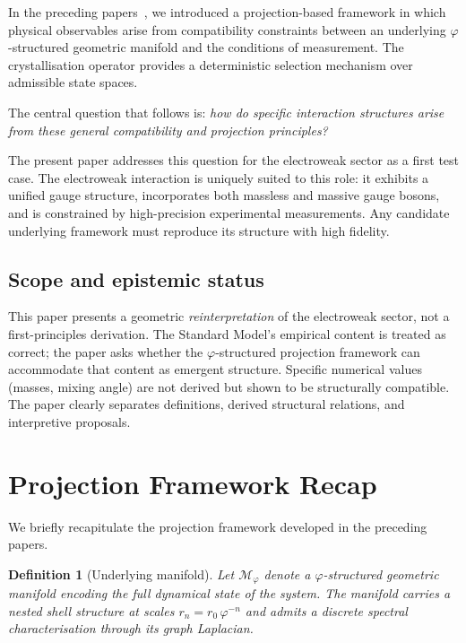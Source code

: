 \documentclass[12pt]{article}
\newtheorem{definition}[theorem]{Definition}
\newcommand{\Mcal}{\mathcal{M}}
\newcommand{\phig}{\varphi}
\begin{document}
In the preceding papers~\citep{SmartBridge, SmartV}, we introduced a projection-based framework in which physical observables arise from compatibility constraints between an underlying $\phig$-structured geometric manifold and the conditions of measurement. The crystallisation operator provides a deterministic selection mechanism over admissible state spaces.

The central question that follows is: \textit{how do specific interaction structures arise from these general compatibility and projection principles?}

The present paper addresses this question for the electroweak sector as a first test case. The electroweak interaction is uniquely suited to this role: it exhibits a unified gauge structure, incorporates both massless and massive gauge bosons, and is constrained by high-precision experimental measurements. Any candidate underlying framework must reproduce its structure with high fidelity.

\subsection*{Scope and epistemic status}

This paper presents a geometric \textit{reinterpretation} of the electroweak sector, not a first-principles derivation. The Standard Model's empirical content is treated as correct; the paper asks whether the $\phig$-structured projection framework can accommodate that content as emergent structure. Specific numerical values (masses, mixing angle) are not derived but shown to be structurally compatible. The paper clearly separates definitions, derived structural relations, and interpretive proposals.

\section{Projection Framework Recap}\label{sec:projection}

We briefly recapitulate the projection framework developed in the preceding papers.

\begin{definition}[Underlying manifold]\label{def:manifold}
Let $\Mcal_\phig$ denote a $\phig$-structured geometric manifold encoding the full dynamical state of the system. The manifold carries a nested shell structure at scales $r_n = r_0\, \phig^{-n}$ and admits a discrete spectral characterisation through its graph Laplacian.
\end{definition}
\end{document}
